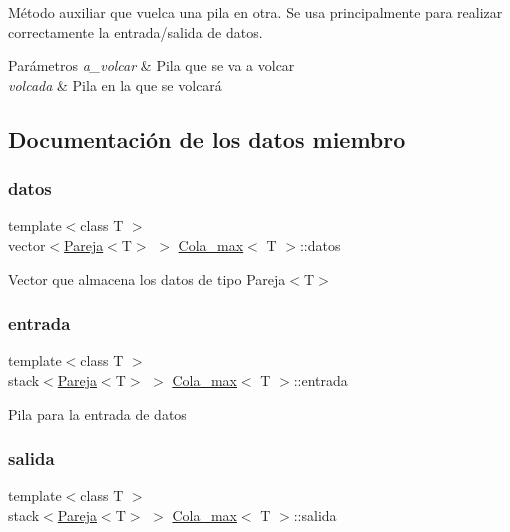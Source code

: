 Método auxiliar que vuelca una pila en otra. Se usa principalmente para realizar correctamente la entrada/salida de datos. 


\begin{DoxyParams}{Parámetros}
{\em a\+\_\+volcar} & Pila que se va a volcar \\
\hline
{\em volcada} & Pila en la que se volcará \\
\hline
\end{DoxyParams}


\subsection{Documentación de los datos miembro}
\mbox{\label{classCola__max_ada37415a95bf9e23e54aa10b478270cf}} 
\subsubsection{\texorpdfstring{datos}{datos}}
{\footnotesize\ttfamily template$<$class T $>$ \\
vector$<$\hyperlink{structPareja}{Pareja}$<$T$>$ $>$ \hyperlink{classCola__max}{Cola\+\_\+max}$<$ T $>$\+::datos\hspace{0.3cm}{\ttfamily [private]}}

Vector que almacena los datos de tipo Pareja$<$\+T$>$ \mbox{\label{classCola__max_a6bf7cfc0872c68657dbc7fabb4fa2fc5}} 
\subsubsection{\texorpdfstring{entrada}{entrada}}
{\footnotesize\ttfamily template$<$class T $>$ \\
stack$<$\hyperlink{structPareja}{Pareja}$<$T$>$ $>$ \hyperlink{classCola__max}{Cola\+\_\+max}$<$ T $>$\+::entrada\hspace{0.3cm}{\ttfamily [private]}}

Pila para la entrada de datos \mbox{\label{classCola__max_ac59781b55ff4f65d8a87b06e2d498fa5}} 
\subsubsection{\texorpdfstring{salida}{salida}}
{\footnotesize\ttfamily template$<$class T $>$ \\
stack$<$\hyperlink{structPareja}{Pareja}$<$T$>$ $>$ \hyperlink{classCola__max}{Cola\+\_\+max}$<$ T $>$\+::salida\hspace{0.3cm}{\ttfamily [private]}}

